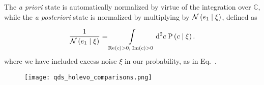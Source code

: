 The \emph{a priori} state is automatically normalized by virtue of the integration over $\mathbb{C}$, while the \emph{a posteriori} state is normalized by multiplying by $\mathcal{N}\left(e_1 \; \middle| \; \xi \right)$, defined as 

\begin{equation}
\frac{1}{\mathcal{N}\left(e_1 \; \middle| \; \xi\right)} = \int\limits_{\text{Re}\left(c\right) > 0, \; \text{Im}\left(c\right)>0} \mathop{}\!\mathrm{d^2} c \; \text{P}\left(c \; \middle| \; \xi \right).
\end{equation}
where we have included excess noise $\xi$ in our probability, as in Eq.~.




\begin{figure}
\texttt{[image: qds\_holevo\_comparisons.png]}
\caption{\label{fig:qds_holevo_comparisons}}
\end{figure}












